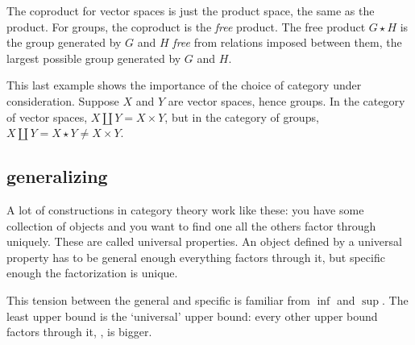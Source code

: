 \documentclass[a5paper]{scrartcl}
\begin{document}
The coproduct for vector spaces is just the product space, the same as the product. For groups, the coproduct is the \emph{free} product. The free product \(G\star H\) is the group generated by \(G\) and \(H\) \emph{free} from relations imposed between them, the largest possible group generated by \(G\) and \(H\).

This last example shows the importance of the choice of category under consideration. Suppose \(X\) and \(Y\) are vector spaces, hence groups. In the category of vector spaces, \(X\amalg Y = X \times Y\), but in the category of groups, \(X\amalg Y =X\star Y \neq X \times Y\).

\subsection{generalizing}
\begin{defn}
  A lot of constructions in category theory work like these: you have some collection of objects and you want to find one all the others factor through uniquely. These are called universal properties. An object defined by a universal property has to be general enough everything factors through it, but specific enough the factorization is unique.
\end{defn}
This tension between the general and specific is familiar from \(\inf\) and \(\sup\). The least upper bound is the `universal' upper bound: every other upper bound factors through it, \ie, is bigger.
\end{document}
